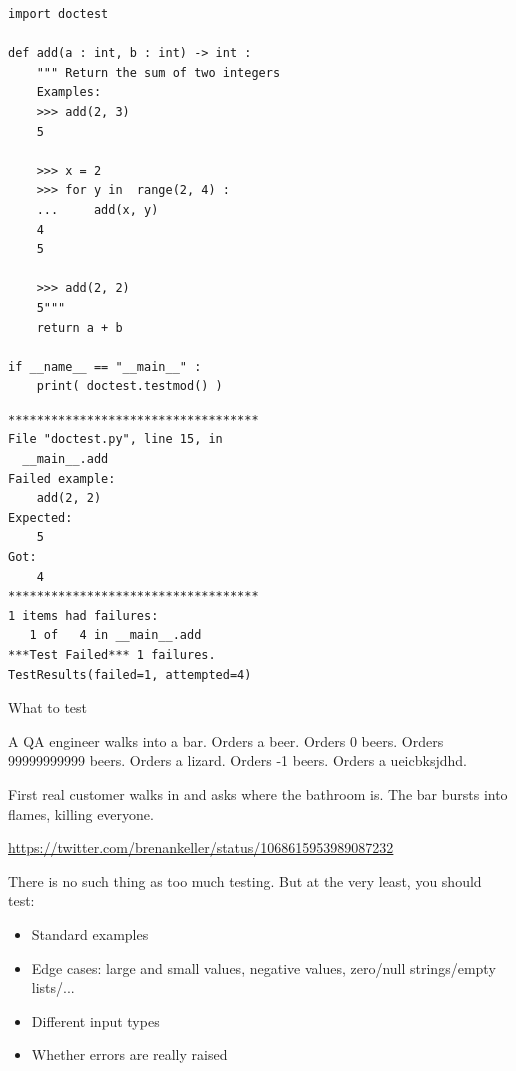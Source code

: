 
\begin{frame}[fragile]
%
\begin{tcbraster}[raster columns=2,
                  raster equal height,
                  nobeforeafter,
                  raster column skip=0.5cm]
\begin{codebox}
\begin{verbatim}
import doctest

def add(a : int, b : int) -> int :
    """ Return the sum of two integers
    Examples:
    >>> add(2, 3)
    5
    
    >>> x = 2
    >>> for y in  range(2, 4) :
    ...     add(x, y)
    4
    5
    
    >>> add(2, 2)
    5"""
    return a + b

if __name__ == "__main__" :
    print( doctest.testmod() )
\end{verbatim}
\end{codebox}
%
\begin{cmdbox}
\begin{verbatim}
***********************************
File "doctest.py", line 15, in 
  __main__.add
Failed example:
    add(2, 2)
Expected:
    5
Got:
    4
***********************************
1 items had failures:
   1 of   4 in __main__.add
***Test Failed*** 1 failures.
TestResults(failed=1, attempted=4)
\end{verbatim}
\end{cmdbox}

%
\end{tcbraster}
%
\end{frame}


\begin{frame}{What to test}
%
\begin{tcolorbox}[title=Tweet by @brenankeller{,} Engineer at snapchat]
\small
A QA engineer walks into a bar. Orders a beer. Orders 0 beers. Orders 99999999999 beers. Orders a lizard. Orders -1 beers. Orders a ueicbksjdhd. 

First real customer walks in and asks where the bathroom is. The bar bursts into flames, killing everyone.
\begin{flushright}
\tiny
\url{https://twitter.com/brenankeller/status/1068615953989087232}
\end{flushright}
\end{tcolorbox}
%
There is no such thing as too much testing. But at the very least, you should test:
\begin{itemize}
\item Standard examples
\item Edge cases: large and small values, negative values, zero/null strings/empty lists/...
\item Different input types
\item Whether errors are really raised
\end{itemize}
%
\end{frame}

